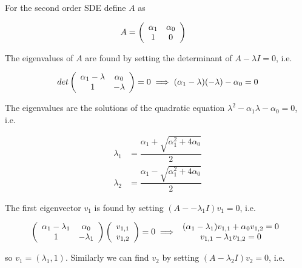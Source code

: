\documentclass{article}
\numberwithin{questioncounter}{section}
\begin{document}
\begin{solution}
For the second order SDE define $A$ as

\begin{align*}
A &= \left(\begin{array}{c c} \alpha_{1} & \alpha_{0} \\ 1 & 0 \end{array} \right)
\end{align*}

The eigenvalues of $A$ are found by setting the determinant of $A - \lambda I = 0$, i.e.

\begin{align*}
det\left(\begin{array}{c c} \alpha_{1} - \lambda & \alpha_{0} \\ 1 & -\lambda \end{array} \right) = 0 \implies  (\alpha_{1} - \lambda)(-\lambda) -\alpha_{0} = 0
\end{align*}

The eigenvalues are the solutions of the quadratic equation $\lambda^{2} - \alpha_{1}\lambda - \alpha_{0} = 0$, i.e.

\begin{align*}
\lambda_{1} &= \dfrac{\alpha_{1} + \sqrt{\alpha_{1}^{2} + 4\alpha_{0}}}{2} \\
\lambda_{2} &= \dfrac{\alpha_{1} - \sqrt{\alpha_{1}^{2} + 4\alpha_{0}}}{2}
\end{align*}

The first eigenvector $v_{1}$ is found by setting $(A -- \lambda_{1}I) v_{1} = 0$, i.e.

\begin{align*}
\left(\begin{array}{c c} \alpha_{1} - \lambda_{1} & \alpha_{0} \\ 1 & -\lambda_{1} \end{array}\right) \left(\begin{array}{c} v_{1,1} \\ v_{1,2} \end{array} \right) = 0 \implies \begin{array}{c} (\alpha_{1} - \lambda_{1}) v_{1,1} + \alpha_{0} v_{1,2} = 0 \\ v_{1,1} - \lambda_{1} v_{1,2} = 0 \end{array}
\end{align*}

so $v_{1} = (\lambda_{1}, 1)$. Similarly we can find $v_{2}$ by setting $(A - \lambda_{2}I)v_{2} = 0$, i.e.


\end{solution}
\end{document}

